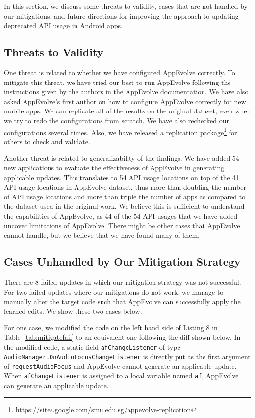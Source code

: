 In this section, we discuss some threats to validity, cases that are not
handled by our mitigations, and future directions for improving the
approach to updating deprecated API usage in Android apps.

\subsection{Threats to Validity}

One threat is related to whether we have configured AppEvolve correctly. To mitigate this threat, we have tried our best to run AppEvolve following the instructions given by the authors in the AppEvolve documentation. We have also asked AppEvolve's first author on how to configure AppEvolve correctly for new mobile apps. We can replicate all of the results on the original dataset, even when we try to redo the configurations from scratch.  We have also rechecked our configurations several times. Also, we have released a replication package\footnote{\url{https://sites.google.com/smu.edu.sg/appevolve-replication}} for others to check and validate.

Another threat is related to generalizability of the findings. We have added 54 new applications to evaluate the effectiveness of
AppEvolve in generating applicable updates. This translates to 54 API usage
locations on top of the 41 API usage locations in AppEvolve dataset, thus
more than doubling the number of API usage locations and more than triple the number of apps as compared to the dataset used in the original work. We
believe this is sufficient to understand the capabilities of AppEvolve, as
44 of the 54 API usages that we have added uncover limitations of
AppEvolve. There might be other cases that AppEvolve cannot handle, but we
believe that we have found many of them.


\subsection{Cases Unhandled by Our Mitigation Strategy}

There are 8 failed updates in which our mitigation strategy was not successful. For two failed updates where our mitigations do not work, we manage to manually alter the target code such that
AppEvolve can successfully apply the learned edits. We show these two cases below.

For one case, we modified the code on the left hand side of Listing 8 in Table~\ref{tab:mitigatefail} to an equivalent one following the diff shown below. In the modified code, a static field {\tt afChangeListener} of type {\tt AudioManager.OnAudioFocusChangeListener} is directly put as the first argument of {\tt requestAudioFocus} and AppEvolve cannot generate an applicable update. When {\tt afChangeListener} is assigned to a local variable named {\tt af}, AppEvolve can generate an applicable update.

